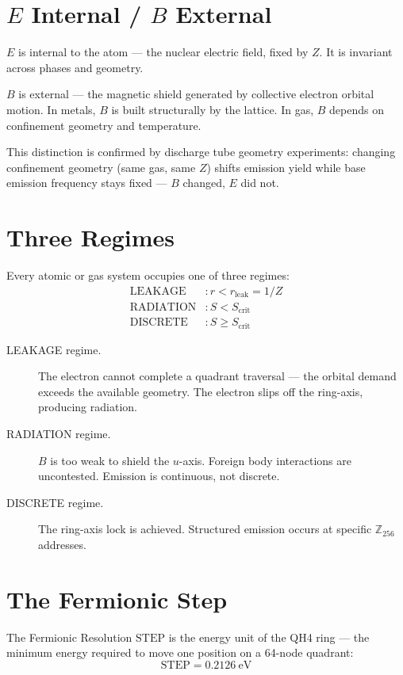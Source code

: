 \documentclass[12pt,a4paper]{article}
\theoremstyle{definition}
\begin{document}
\section{$E$ Internal / $B$ External}

$E$ is internal to the atom --- the nuclear electric field, fixed by $Z$. It is invariant across phases and geometry.

$B$ is external --- the magnetic shield generated by collective electron orbital motion. In metals, $B$ is built structurally by the lattice. In gas, $B$ depends on confinement geometry and temperature.

This distinction is confirmed by discharge tube geometry experiments: changing confinement geometry (same gas, same $Z$) shifts emission yield while base emission frequency stays fixed --- $B$ changed, $E$ did not.

\section{Three Regimes}

Every atomic or gas system occupies one of three regimes:
\begin{align*}
  \text{LEAKAGE}  &: r < r_{\mathrm{leak}} = 1/Z\\
  \text{RADIATION}&: S < S_{\mathrm{crit}}\\
  \text{DISCRETE} &: S \geq S_{\mathrm{crit}}
\end{align*}

\begin{description}
  \item[LEAKAGE regime.] The electron cannot complete a quadrant traversal --- the orbital demand exceeds the available geometry. The electron slips off the ring-axis, producing radiation.
  \item[RADIATION regime.] $B$ is too weak to shield the $u$-axis. Foreign body interactions are uncontested. Emission is continuous, not discrete.
  \item[DISCRETE regime.] The ring-axis lock is achieved. Structured emission occurs at specific $\mathbb{Z}_{256}$ addresses.
\end{description}

\section{The Fermionic Step}

The Fermionic Resolution $\mathrm{STEP}$ is the energy unit of the QH4 ring --- the minimum energy required to move one position on a 64-node quadrant:
\begin{equation}
  \mathrm{STEP} = 0.2126\ \mathrm{eV}
\end{equation}
\end{document}
